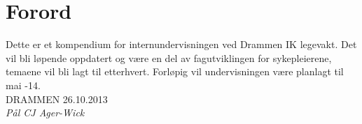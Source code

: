 		\chapter{Forord}%
				Dette er et kompendium for internundervisningen ved Drammen IK legevakt. Det vil bli løpende oppdatert og være en del av fagutviklingen for sykepleierene, temaene vil bli lagt til etterhvert. Forløpig vil undervisningen være planlagt til mai -14.
				\\[0.7in]



				DRAMMEN 26.10.2013\\[0.4in]

				\emph{Pål CJ Ager-Wick}

	\newpage
	\tableofcontents